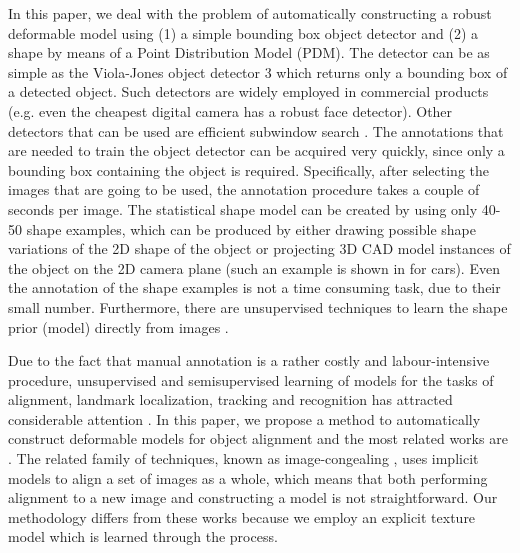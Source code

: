 In this paper, we deal with the problem of automatically
constructing a robust deformable model using (1) a simple
bounding box object detector and (2) a shape by means of
a Point Distribution Model (PDM). The detector can be as
simple as the Viola-Jones object detector \cite{?}
3 which returns
only a bounding box of a detected object. Such detectors
are widely employed in commercial products (e.g.
even the cheapest digital camera has a robust face detector).
Other detectors that can be used are efficient subwindow
search \cite{?}. The
annotations that are needed to train the object detector can
be acquired very quickly, since only a bounding box containing the object is required. Specifically, after selecting
the images that are going to be used, the annotation procedure
takes a couple of seconds per image. The statistical
shape model can be created by using only 40-50 shape examples,
which can be produced by either drawing possible
shape variations of the 2D shape of the object or projecting
3D CAD model instances of the object on the 2D camera
plane (such an example is shown in \cite{?} for cars). Even
the annotation of the shape examples is not a time consuming
task, due to their small number. Furthermore, there are
unsupervised techniques to learn the shape prior (model) directly
from images \cite{?}.

Due to the fact that manual annotation is a rather costly
and labour-intensive procedure, unsupervised and semisupervised
learning of models for the tasks of alignment,
landmark localization, tracking and recognition has attracted
considerable attention \cite{?}. In this paper, we
propose a method to automatically construct deformable
models for object alignment and the most related works
are \cite{?}. The related family of techniques,
known as image-congealing \cite{?}, uses implicit
models to align a set of images as a whole, which means
that both performing alignment to a new image and constructing
a model is not straightforward. Our methodology
differs from these works because we employ an explicit texture
model which is learned through the process.


